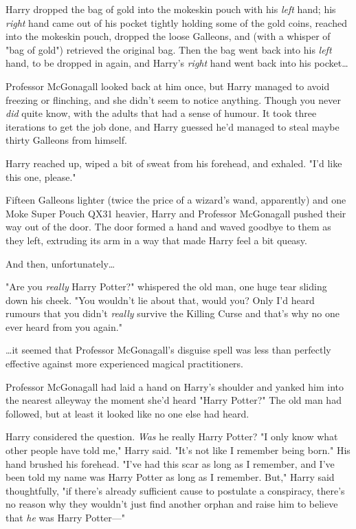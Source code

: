 Harry dropped the bag of gold into the mokeskin pouch with his \emph{left} 
hand; his \emph{right} hand came out of his pocket tightly holding some of the 
gold coins, reached into the mokeskin pouch, dropped the loose Galleons, and 
(with a whisper of "bag of gold") retrieved the original bag. Then the bag went 
back into his \emph{left} hand, to be dropped in again, and Harry's 
\emph{right} hand went back into his pocket{\ldots}

Professor McGonagall looked back at him once, but Harry managed to avoid 
freezing or flinching, and she didn't seem to notice anything. Though you never 
\emph{did} quite know, with the adults that had a sense of humour. It took 
three iterations to get the job done, and Harry guessed he'd managed to steal 
maybe thirty Galleons from himself.

Harry reached up, wiped a bit of sweat from his forehead, and exhaled. "I'd 
like this one, please."

Fifteen Galleons lighter (twice the price of a wizard's wand, apparently) and 
one Moke Super Pouch QX31 heavier, Harry and Professor McGonagall pushed their 
way out of the door. The door formed a hand and waved goodbye to them as they 
left, extruding its arm in a way that made Harry feel a bit queasy.

And then, unfortunately{\ldots}

"Are you \emph{really} Harry Potter?" whispered the old man, one huge tear 
sliding down his cheek. "You wouldn't lie about that, would you? Only I'd heard 
rumours that you didn't \emph{really} survive the Killing Curse and that's why 
no one ever heard from you again."

{\ldots}it seemed that Professor McGonagall's disguise spell was less than 
perfectly effective against more experienced magical practitioners.

Professor McGonagall had laid a hand on Harry's shoulder and yanked him into 
the nearest alleyway the moment she'd heard "Harry Potter?" The old man had 
followed, but at least it looked like no one else had heard.

Harry considered the question. \emph{Was} he really Harry Potter? "I only know 
what other people have told me," Harry said. "It's not like I remember being 
born." His hand brushed his forehead. "I've had this scar as long as I 
remember, and I've been told my name was Harry Potter as long as I remember. 
But," Harry said thoughtfully, "if there's already sufficient cause to 
postulate a conspiracy, there's no reason why they wouldn't just find another 
orphan and raise him to believe that \emph{he} was Harry Potter---"

